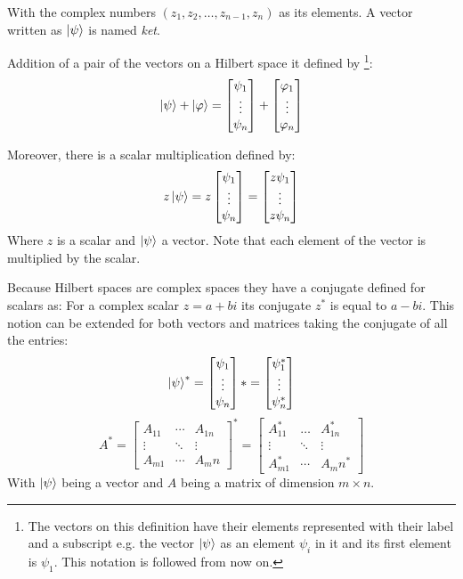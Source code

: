 With the complex numbers $(z_{1}, z_{2}, \dots , z_{n-1}, z_{n} )$ as its elements. A vector written as $\ket{\psi}$ is named \textit{ket}.

Addition of a pair of the vectors on a Hilbert space it defined by \footnote{The vectors on this definition have their elements represented with their label and a subscript e.g. the vector $\ket{\psi}$ as an element $\psi_{i}$ in it and its first element is $\psi_{1}$. This notation is followed from now on.}: 
$$
\ket{\psi} + \ket{\varphi} = \begin{bmatrix} \psi_{1} \\ \vdots \\ \psi_{n} \end{bmatrix} +
\begin{bmatrix} \varphi_{1} \\ \vdots \\ \varphi_{n} \end{bmatrix}
$$

Moreover, there is a scalar multiplication defined by:
$$
  z\ket{\psi} = z\begin{bmatrix} \psi_{1} \\ \vdots \\ \psi_{n} \end{bmatrix} = \begin{bmatrix} z \psi_{1} \\ \vdots \\ z \psi_{n} \end{bmatrix}
$$
Where $z$ is a scalar and $\ket{\psi}$ a vector. Note that each element of the vector is multiplied by the scalar. 

Because Hilbert spaces are complex spaces they have a conjugate defined for scalars as:
For a complex scalar $z = a +bi$ its conjugate $z^*$ is equal to $a -bi$. This notion can be extended for both vectors and matrices taking the conjugate of all the entries:
$$
\ket{\psi}^{*} = 
	\begin{bmatrix} \psi_{1} \\ \vdots \\ \psi_{n} \end{bmatrix}* = \begin{bmatrix} \psi_{1}^* \\ \vdots \\ \psi_{n}^* \end{bmatrix}
$$
$$
A^{*} = 
	\begin{bmatrix} 
	A_{11} & \cdots & A_{1n}\\ 
	\vdots & \ddots & \vdots \\ 
	A_{m1} & \cdots & A_mn
\end{bmatrix}^* 
= \begin{bmatrix} 
	A_{11}^* & \dots & A_{1n}^*\\ 
	\vdots & \ddots & \vdots \\ 
	A_{m1}^* & \cdots & A_mn^*
\end{bmatrix}
$$
With $\ket{\psi}$ being a vector and $A$ being a matrix of dimension $m \times n$.


